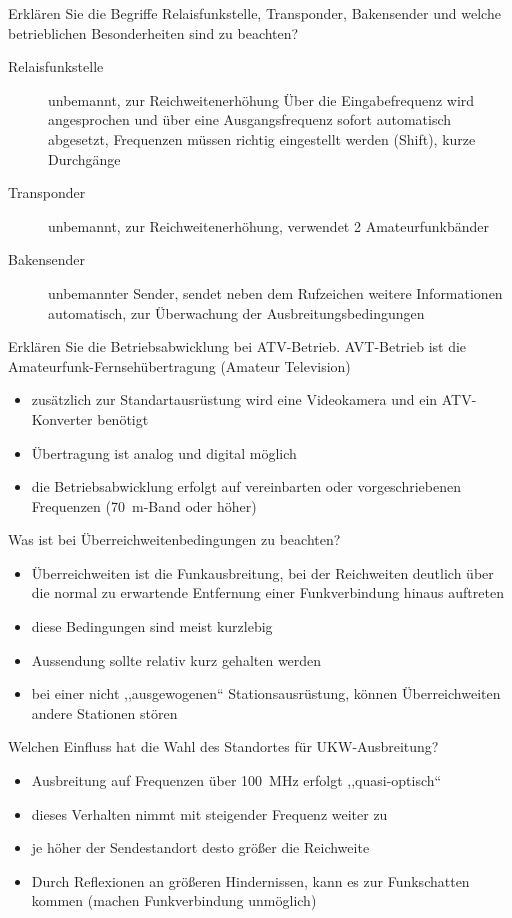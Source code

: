 \documentclass[avery5371,grid,frame,a4paper]{flashcards}
\newcommand{\card}[3]{
  \begin{flashcard}[{\chap} -- #1]{#2}#3\end{flashcard}
}
\begin{document}
\card{63}{Erklären Sie die Begriffe Relaisfunkstelle, Transponder, Bakensender und welche betrieblichen Besonderheiten sind zu beachten?}{
  \small
  \begin{description}
    \item[Relaisfunkstelle] unbemannt, zur Reichweitenerhöhung
      Über die Eingabefrequenz wird angesprochen und über eine Ausgangsfrequenz sofort automatisch abgesetzt, Frequenzen müssen richtig eingestellt werden (Shift), kurze Durchgänge
    \item[Transponder] unbemannt, zur Reichweitenerhöhung, verwendet 2 Amateurfunkbänder
    \item[Bakensender] unbemannter Sender, sendet neben dem Rufzeichen weitere Informationen automatisch, zur Überwachung der Ausbreitungsbedingungen
  \end{description}
}
\card{64}{Erklären Sie die Betriebsabwicklung bei ATV-Betrieb.}{
  AVT-Betrieb ist die Amateurfunk-Fernsehübertragung (Amateur Television)
  \begin{itemize}
    \item zusätzlich zur Standartausrüstung wird eine Videokamera und ein ATV-Konverter benötigt
    \item Übertragung ist analog und digital möglich
    \item die Betriebsabwicklung erfolgt auf vereinbarten oder vorgeschriebenen Frequenzen (\SI{70}{\metre}-Band oder höher)
  \end{itemize}
}
\card{65}{Was ist bei Überreichweitenbedingungen zu beachten?}{
  \small
  \begin{itemize}
    \item Überreichweiten ist die Funkausbreitung, bei der Reichweiten deutlich über die normal zu erwartende Entfernung einer Funkverbindung hinaus auftreten
    \item diese Bedingungen sind meist kurzlebig
    \item Aussendung sollte relativ kurz gehalten werden
    \item bei einer nicht ,,ausgewogenen`` Stationsausrüstung, können Überreichweiten andere Stationen stören
  \end{itemize}
}
\card{66}{Welchen Einfluss hat die Wahl des Standortes für UKW-Ausbreitung?}{
  \begin{itemize}
    \item Ausbreitung auf Frequenzen über \SI{100}{\mega\Hz} erfolgt ,,quasi-optisch``
    \item dieses Verhalten nimmt mit steigender Frequenz weiter zu
    \item je höher der Sendestandort desto größer die Reichweite
    \item Durch Reflexionen an größeren Hindernissen, kann es zur Funkschatten kommen (machen Funkverbindung unmöglich)
  \end{itemize}
}
\end{document}
